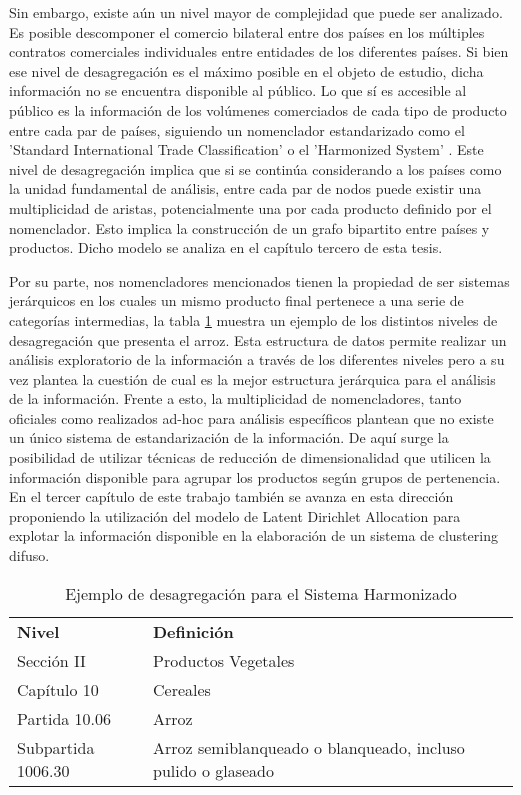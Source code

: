 \documentclass[class=article, crop=false]{standalone}
\begin{document}
Sin embargo, existe aún un nivel mayor de complejidad que puede ser analizado. Es posible descomponer el comercio bilateral entre dos países en los múltiples contratos comerciales individuales entre entidades de los diferentes países. Si bien ese nivel de desagregación es el máximo posible en el objeto de estudio, dicha información no se encuentra disponible al público. Lo que sí es accesible al público es la información de los volúmenes comerciados de cada tipo de producto entre cada par de países, siguiendo un nomenclador estandarizado como el 'Standard International Trade Classification' \citep{united2006standard} o el 'Harmonized System' \citep{weerth2008basic}. 
Este nivel de desagregación implica que si se continúa considerando a los países como la unidad fundamental de análisis, entre cada par de nodos puede existir una multiplicidad de aristas, potencialmente una por cada producto definido por el nomenclador. Esto implica la construcción de un grafo bipartito entre países y productos. Dicho modelo se analiza en el capítulo tercero de esta tesis. 

Por su parte, nos nomencladores mencionados tienen la propiedad de ser sistemas jerárquicos en los cuales un mismo producto final pertenece a una serie de categorías intermedias, la tabla  \ref{table:ejemplo-hs} muestra un ejemplo de los distintos niveles de desagregación que presenta el arroz. Esta estructura de datos permite realizar un análisis exploratorio de la información a través de los diferentes niveles pero a su vez plantea la cuestión de cual es la mejor estructura jerárquica para el análisis de la información. Frente a esto, la multiplicidad de nomencladores, tanto oficiales como realizados ad-hoc para análisis específicos \citep{molinari2016especializacion} plantean que no existe un único sistema de estandarización de la información. De aquí surge la posibilidad de utilizar técnicas de reducción de dimensionalidad que utilicen la información disponible para agrupar los productos según grupos de pertenencia. En el tercer capítulo de este trabajo también se avanza en esta dirección proponiendo la utilización del modelo de Latent Dirichlet Allocation \citep{blei2003latent} para explotar la información disponible en la elaboración de un sistema de clustering difuso. 


\begin{table}[]
	\begin{tabular}{ll}
		\textbf{Nivel}     & \textbf{Definición}                                          \\
		Sección II         & Productos Vegetales                                          \\
		Capítulo 10        & Cereales                                                     \\
		Partida 10.06      & Arroz                                                        \\
		Subpartida 1006.30 & Arroz semiblanqueado o blanqueado, incluso pulido o glaseado
	\end{tabular}
	\caption{Ejemplo de desagregación para el Sistema Harmonizado}
	\label{table:ejemplo-hs}
\end{table}
\end{document}
